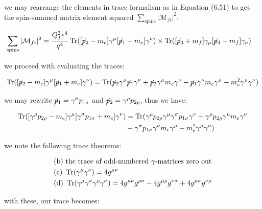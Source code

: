 \documentclass[11pt]{article}
\theoremstyle{definition}
\begin{document}
we may rearrange the elements in trace formalism as in Equation (6.51) to get the spin-summed matrix element squared $\sum_{\text{spins}} |\mathcal{M}_{fi}|^2$:

\begin{align}
    \sum_{\text{spins}} |\mathcal{M}_{fi}|^2  &= \frac{Q_f^2e^4}{q^4} 
    \Trace([\cancel{p}_2-m_e]\gamma^{\mu}[\cancel{p}_1+m_e]\gamma^{\nu}) \times 
    \Trace([\cancel{p}_3+m_f]\gamma_{\mu}[\cancel{p}_4-m_f]\gamma_{\nu})
\end{align}

we proceed with evaluating the traces:

\begin{align}
    \Trace([\cancel{p}_2-m_e]\gamma^{\mu}[\cancel{p}_1+m_e]\gamma^{\nu}) &=
    \Trace(\cancel{p}_2\gamma^{\mu}\cancel{p}_1\gamma^{\nu} 
    + \cancel{p}_2\gamma^{\mu}m_e\gamma^{\nu}
    - \cancel{p}_1\gamma^{\nu}m_e\gamma^{\mu}
    - m_e^2\gamma^{\mu}\gamma^{\nu}
    )\\
\end{align}

we may rewrite $\cancel{p}_1 = \gamma^{\sigma}p_{1\sigma}$ and $\cancel{p}_2 = \gamma^{\rho}p_{2\rho}$, thus we have:

\begin{align}
    \Trace([\gamma^{\rho}p_{2\rho}-m_e]\gamma^{\mu}[\gamma^{\sigma}p_{1\sigma}+m_e]\gamma^{\nu}) &=
    \Trace(\gamma^{\rho}p_{2\rho}\gamma^{\mu}\gamma^{\sigma}p_{1\sigma}\gamma^{\nu} 
    + \gamma^{\rho}p_{2\rho}\gamma^{\mu}m_e\gamma^{\nu}
    \\ &- \gamma^{\sigma}p_{1\sigma}\gamma^{\nu}m_e\gamma^{\mu}
    - m_e^2\gamma^{\mu}\gamma^{\nu}
    )
\end{align}

we note the following trace theorems:

\begin{align*}
    &\text{(b) the trace of odd-numbered $\gamma$-matrices zero out}\\
    &\text{(c) }\Trace(\gamma^{\mu}\gamma^{\nu}) = 4g^{\mu\nu}\\
    &\text{(d) }\Trace(\gamma^{\mu}\gamma^{\nu}\gamma^{\rho}\gamma^{\sigma}) = 4g^{\mu\nu}g^{\rho\sigma} - 4g^{\mu\rho}g^{\nu\sigma} + 4g^{\mu\sigma}g^{\nu\rho}
\end{align*}

with these, our trace becomes:
\end{document}
